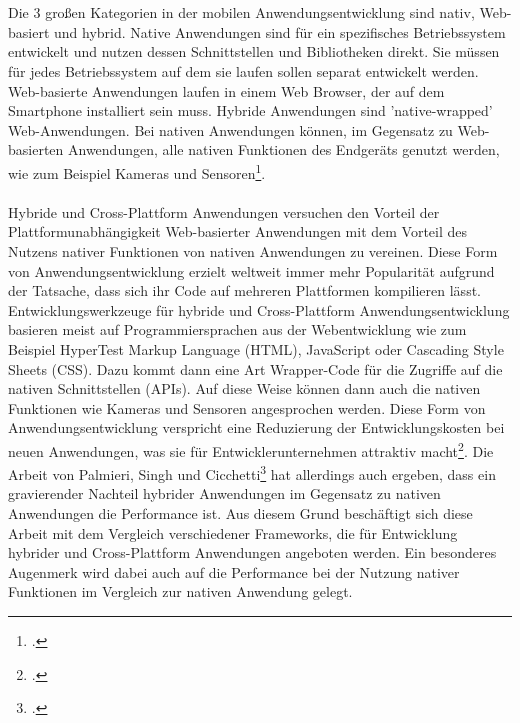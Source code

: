 \\
\\
Die 3 großen Kategorien in der mobilen Anwendungsentwicklung sind nativ, Web-basiert und hybrid. Native Anwendungen sind für ein spezifisches Betriebssystem entwickelt und nutzen dessen Schnittstellen und Bibliotheken direkt. Sie müssen für jedes Betriebssystem auf dem sie laufen sollen separat entwickelt werden. Web-basierte Anwendungen laufen in einem Web Browser, der auf dem Smartphone installiert sein muss. Hybride Anwendungen sind 'native-wrapped' Web-Anwendungen. Bei nativen Anwendungen können, im Gegensatz zu Web-basierten Anwendungen, alle nativen Funktionen des Endgeräts genutzt werden, wie zum Beispiel Kameras und Sensoren\footcite{ChallOppMobAppDev}. 
\\
\\
Hybride und Cross-Plattform Anwendungen versuchen den Vorteil der Plattformunabhängigkeit Web-basierter Anwendungen mit dem Vorteil des Nutzens nativer Funktionen von nativen Anwendungen zu vereinen. Diese Form von Anwendungsentwicklung erzielt weltweit immer mehr Popularität aufgrund der Tatsache, dass sich ihr Code auf mehreren Plattformen kompilieren lässt. Entwicklungswerkzeuge für hybride und Cross-Plattform Anwendungsentwicklung basieren meist auf Programmiersprachen aus der Webentwicklung wie zum Beispiel HyperTest Markup Language (HTML), JavaScript oder Cascading Style Sheets (CSS). Dazu kommt dann eine Art Wrapper-Code für die Zugriffe auf die nativen Schnittstellen (APIs). Auf diese Weise können dann auch die nativen Funktionen wie Kameras und Sensoren angesprochen werden. Diese Form von Anwendungsentwicklung verspricht eine Reduzierung der Entwicklungskosten bei neuen Anwendungen, was sie für Entwicklerunternehmen attraktiv macht\footcite{ComparisonCrossPlatMobDevTools}. Die Arbeit von Palmieri, Singh und Cicchetti\footcite{ComparisonCrossPlatMobDevTools} hat allerdings auch ergeben, dass ein gravierender Nachteil hybrider Anwendungen im Gegensatz zu nativen Anwendungen die Performance ist. Aus diesem Grund beschäftigt sich diese Arbeit mit dem Vergleich verschiedener Frameworks, die für Entwicklung hybrider und Cross-Plattform Anwendungen angeboten werden. Ein besonderes Augenmerk wird dabei auch auf die Performance bei der Nutzung nativer Funktionen im Vergleich zur nativen Anwendung gelegt.